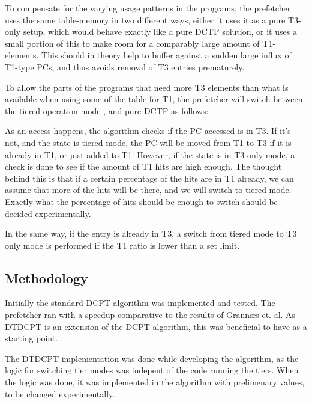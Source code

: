 To compensate for the varying usage patterns in the programs, the prefetcher
uses the same table-memory in two different ways, either it uses it as a pure
T3-only setup, which would behave exactly like a pure DCTP solution, or it
uses a small portion of this to make room for a comparably large amount of
T1-elements. This should in theory help to buffer against a sudden large
influx of T1-type PCs, and thus avoids removal of T3 entries
prematurely.

To allow the parts of the programs that need more T3 elements than what is
available when using some of the table for T1, the prefetcher will switch
between the tiered operation mode , and pure DCTP as follows:

As an access happens, the algorithm checks if the PC accessed is in T3. If it's
not, and the state is tiered mode, the PC will be moved from T1 to T3 if it is
already in T1, or just added to T1. However, if the state is in T3 only
mode, a check is done to see if the amount of T1 hits are high enough. The
thought behind this is that if a certain percentage of the hits are in T1
already, we can assume that more of the hits will be there, and we will switch
to tiered mode. Exactly what the percentage of hits should be enough to
switch should be decided experimentally.

In the same way, if the entry is already in T3, a switch from tiered mode to
T3 only mode is performed if the T1 ratio is lower than a set limit.

\subsection{Methodology}

Initially the standard DCPT algorithm was implemented and tested. The prefetcher ran 
with a speedup comparative to the results of Grannæs et. al. As  DTDCPT
is an extension of the DCPT algorithm, this was beneficial to have as a
starting point.

The DTDCPT implementation was done while developing the algorithm, as the logic
for switching tier modes was indepent of the code running the tiers. When the
logic was done, it was implemented in the algorithm with prelimenary values,
to be changed experimentally.

